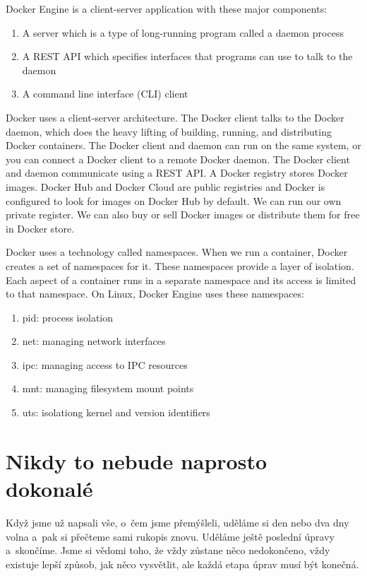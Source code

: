 \begin{itemize}
Docker Engine is a client-server application with these major components:
\begin{enumerate}
\item A server which is a type of long-running program called a daemon process
\item A REST API which specifies interfaces that programs can use to talk to the daemon
\item A command line interface (CLI) client
\end{enumerate}
Docker uses a client-server architecture. The Docker client talks to the Docker daemon, which does the heavy lifting of building, running, and distributing Docker containers. The Docker client and daemon can run on the same system, or you can connect a Docker client to a remote Docker daemon. The Docker client and daemon communicate using a REST API.
A Docker registry stores Docker images. Docker Hub and Docker Cloud are public registries and Docker is configured to look for images on Docker Hub by default. We can run our own private register. We can also buy or sell Docker images or distribute them for free in Docker store.

Docker uses a technology called namespaces. When we run a container, Docker creates a set of namespaces for it. These namespaces provide a layer of isolation. Each aspect of a container runs in a separate namespace and its access is limited to that namespace.
On Linux, Docker Engine uses these namespaces:
\begin{enumerate}
\item pid: process isolation
\item net: managing network interfaces
\item ipc: managing access to IPC resources
\item mnt: managing filesystem mount points
\item uts: isolationg kernel and version identifiers
\end{enumerate}


\chapter{Nikdy to nebude naprosto dokonalé}
Když jsme už napsali vše, o~čem jsme přemýšleli, uděláme si den nebo dva dny volna a~pak si přečteme sami rukopis znovu. Uděláme ještě poslední úpravy a~skončíme. Jsme si vědomi toho, že vždy zůstane něco nedokončeno, vždy existuje lepší způsob, jak něco vysvětlit, ale každá etapa úprav musí být konečná.



\end{itemize}
